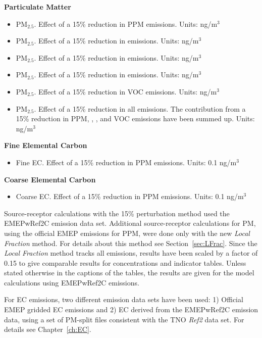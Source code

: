 \textbf{Particulate Matter}
\begin{itemize}
\item PM$_{2.5}$. Effect of a 15\% reduction in PPM emissions. Units: ng/m$^3$ 
\item PM$_{2.5}$. Effect of a 15\% reduction in \sox emissions. Units: ng/m$^3$
\item PM$_{2.5}$. Effect of a 15\% reduction in \nox emissions. Units: ng/m$^3$
\item PM$_{2.5}$. Effect of a 15\% reduction in \nhiii emissions. Units: ng/m$^3$
\item PM$_{2.5}$. Effect of a 15\% reduction in VOC emissions. Units: ng/m$^3$ 
\item PM$_{2.5}$. Effect of a 15\% reduction in all emissions. The
contribution from a 15\% reduction in PPM, \sox, \nox, \nhiii and
VOC emissions have been summed up. Units: ng/m$^3$
\end{itemize}
\vspace{20pt}

\textbf{Fine Elemental Carbon}
\begin{itemize}
\item Fine EC. Effect of a 15\% reduction in PPM emissions. Units: 0.1
  ng/m$^3$
\end{itemize}
\vspace{20pt}

\textbf{Coarse Elemental Carbon}
\begin{itemize}
\item Coarse EC. Effect of a 15\% reduction in PPM emissions. Units:
  0.1 ng/m$^3$
\end{itemize}
\vspace{20pt}

Source-receptor calculations with the 15\% perturbation method used the EMEPwRef2C emission data set. Additional source-receptor calculations for PM, using the official EMEP emissions for PPM, were done only with the new \textit{Local Fraction} method. For details about this method see Section~\ref{sec:LFrac}. Since the \textit{Local Fraction} method tracks all emissions, results have been scaled by a factor of 0.15 to give comparable results for concentrations and indicator tables.
Unless stated otherwise in the captions of the tables, the results are given for the model calculations using EMEPwRef2C emissions.

For EC emissions, two different emission data sets have been used: 1) Official EMEP gridded EC emissions and 2) EC derived from the EMEPwRef2C emission data, using a set of PM-split files consistent with the TNO \textit{Ref2} data set. For details see Chapter~\ref{ch:EC}.

